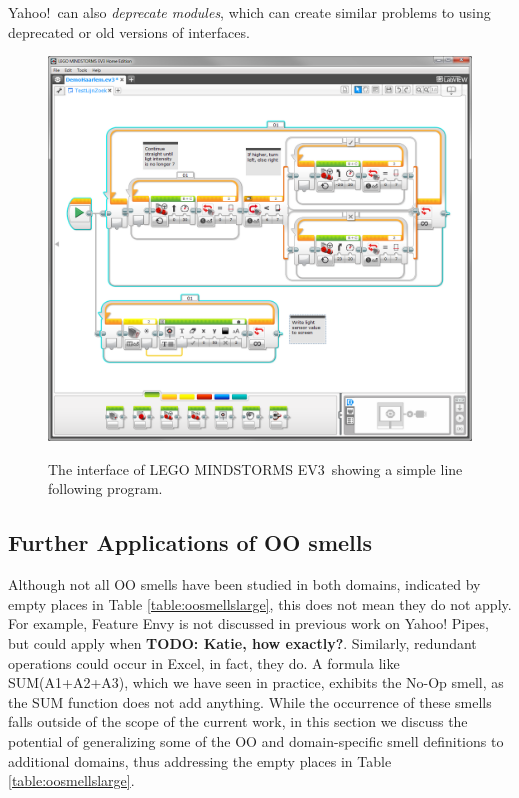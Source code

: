\documentclass{sig-alternate}
\newcommand{\todo}[1]{\textbf{TODO: #1}}
\newcommand{\ms}{LEGO MINDSTORMS EV3}
\begin{document}
Yahoo!\ can also \emph{deprecate modules}, which can create similar problems to using deprecated or old versions of interfaces.


\begin{figure} [ht]
\caption{The interface of \ms~showing a simple line following program.}
\centering
\includegraphics[width=\columnwidth]{img/ms}
\label{fig:ms}
\end{figure}

\subsection{Further Applications of OO smells}
\label{subsec:futuresmells}
Although not all OO smells have been studied in both domains, indicated by empty places in Table \ref{table:oosmellslarge}, this does not mean they do not apply. For example, Feature Envy is not discussed in previous work on Yahoo! Pipes, but could apply when \todo{Katie, how exactly?}. Similarly, redundant operations could occur in Excel, in fact, they do. A formula like SUM(A1+A2+A3), which we have seen in practice, exhibits the No-Op smell, as the SUM function does not add anything. While the occurrence of these smells falls outside of the scope of the current work, in this section we discuss the potential of generalizing some of the OO and domain-specific smell definitions to additional domains, thus addressing the empty places in Table \ref{table:oosmellslarge}.
\end{document}
